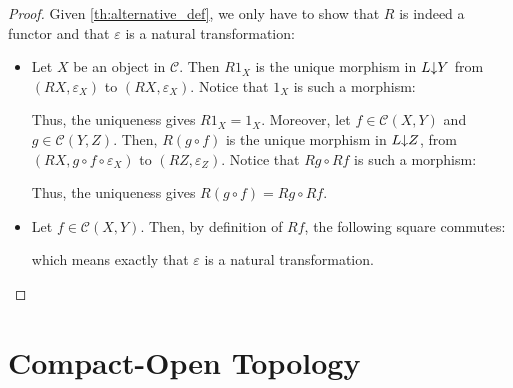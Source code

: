 \begin{proof} Given \ref{th:alternative_def}, we only have to show that $R$ is indeed a functor and that $\varepsilon$ is a natural transformation:
\begin{itemize}
\item Let $X$ be an object in $\mathcal{C}$. Then $R1_X$ is the unique morphism in $L\mkern-5mu\downarrow\mkern-5mu Y$ from $(RX,\varepsilon_X)$ to $(RX,\varepsilon_X)$. Notice that $1_X$ is such a morphism:
\begin{center}
\end{center}
Thus, the uniqueness gives $R1_X=1_X$. Moreover, let $f\in\mathcal{C}(X,Y)$ and $g\in\mathcal{C}(Y,Z)$. Then, $R(g\circ f)$ is the unique morphism in $L\mkern-5mu\downarrow\mkern-5mu Z$, from $(RX,g\circ f\circ\varepsilon_X)$ to $(RZ,\varepsilon_Z)$. Notice that $Rg\circ Rf$ is such a morphism:
\begin{center}
\end{center}
Thus, the uniqueness gives $R(g\circ f)=Rg\circ Rf$.
\item Let $f\in\mathcal{C}(X,Y)$. Then, by definition of $Rf$, the following square commutes:
\begin{center}
\end{center}
which means exactly that $\varepsilon$ is a natural transformation.\qedhere
\end{itemize}
\end{proof}
\section{Compact-Open Topology}



